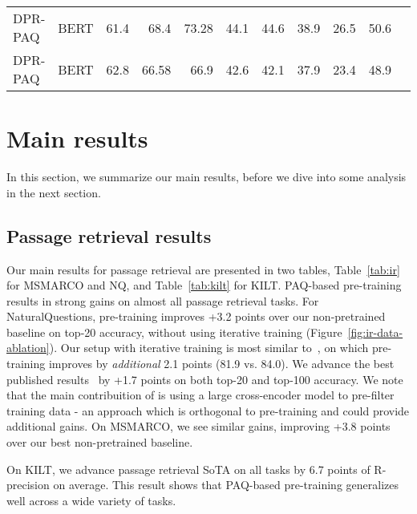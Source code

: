 \documentclass[11pt]{article}
\begin{document}
\begin{table*}[t]
{\begin{tabular}{llrrrrrrrrr}
\midrule
DPR-PAQ & BERT & 61.4 & 68.4 & 73.28 & 44.1 & 44.6 & 38.9 & 26.5 & 50.6 \\
DPR-PAQ & BERT & 62.8 & 66.58 & 66.9 & 42.6 & 42.1 & 37.9 & 23.4 & 48.9 \\
\bottomrule
\end{tabular}
}
\caption{Paragraph-level -Precision on the KILT benchmark.}
\label{tab:kilt}
\end{table*} \section{Main results}
In this section, we summarize our main results, before we dive into some analysis in the next section.  

\subsection{Passage retrieval results}\label{sec:ir_results}
Our main results for passage retrieval are presented in two tables, Table~\ref{tab:ir} for MSMARCO and NQ, and Table~\ref{tab:kilt} for KILT.  PAQ-based pre-training results in strong gains on almost all passage retrieval tasks.  For NaturalQuestions, pre-training improves +3.2 points over our non-pretrained baseline on top-20 accuracy, without using iterative training (Figure~\ref{fig:ir-data-ablation}).  Our setup with iterative training is most similar to~\citep{xiong2020approximate}, on which pre-training improves by \textit{additional} 2.1 points (81.9 vs. 84.0).  We advance the best published results~\citep{qu2021rocketqa} by +1.7 points on both top-20 and top-100 accuracy.  We note that the main contribuition of \citep{qu2021rocketqa} is using a large cross-encoder model to pre-filter training data - an approach which is orthogonal to pre-training and could provide additional gains.  On MSMARCO, we see similar gains, improving +3.8 points over our best non-pretrained baseline.  

On KILT, we advance passage retrieval SoTA on all tasks by 6.7 points of R-precision on average.  This result shows that PAQ-based pre-training generalizes well across a wide variety of tasks.  
\end{document}
